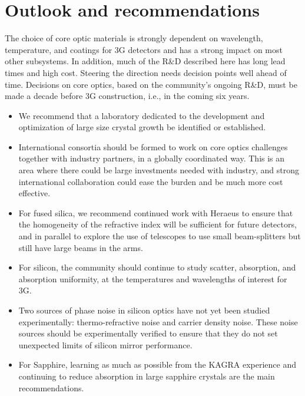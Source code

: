 \section{Outlook and recommendations} 
The choice of core optic materials is strongly dependent on wavelength, temperature, and coatings for 3G detectors and has a strong impact on most other subsystems. In addition, much of the R\&D described here has long lead times and high cost. Steering the direction needs decision points well ahead of time. Decisions on core optics, based on the community's ongoing R\&D, must be made a decade before 3G construction, i.e., in the coming six years. 
\begin{itemize}
\item We recommend that a laboratory dedicated to the development and optimization of large size crystal growth be identified or established.
\item International consortia should be formed to work on core optics challenges together with industry
partners, in a globally coordinated way.  This is an area where there could be large investments needed with industry, and strong international collaboration could ease the burden and be much more cost effective.
\item For fused silica, we recommend continued work with Heraeus to ensure that the homogeneity of the refractive index will be sufficient for future detectors, and in parallel to explore the use of telescopes to use small beam-splitters but still have large beams in the arms. 
\item For silicon, the community should continue to study scatter, absorption, and absorption uniformity, at the temperatures and wavelengths of interest for 3G. 
\item Two sources of phase noise in silicon optics have not yet been studied experimentally: thermo-refractive noise and carrier density noise. These noise sources should be experimentally verified to ensure that they do not set unexpected limits of silicon mirror performance. 
\item For Sapphire, learning as much as possible from the KAGRA experience and continuing to reduce absorption in large sapphire crystals are the main recommendations. 
\end{itemize}

